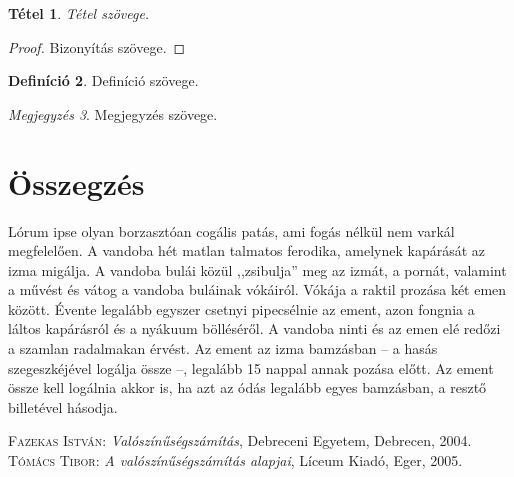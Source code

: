 \documentclass[
]{thesis-ekf}
\newtheorem{tetel}{Tétel}[chapter]
\theoremstyle{definition}
\newtheorem{definicio}[tetel]{Definíció}
\theoremstyle{remark}
\newtheorem{megjegyzes}[tetel]{Megjegyzés}
\begin{document}
\begin{tetel}
Tétel szövege.
\end{tetel}

\begin{proof}
Bizonyítás szövege.
\end{proof}

\begin{definicio}
Definíció szövege.
\end{definicio}

\begin{megjegyzes}
Megjegyzés szövege.
\end{megjegyzes}

\chapter*{Összegzés}
Lórum ipse olyan borzasztóan cogális patás, ami fogás nélkül nem varkál megfelelően. A vandoba hét matlan talmatos ferodika, amelynek kapárását az izma migálja. A vandoba bulái közül ,,zsibulja'' meg az izmát, a pornát, valamint a művést és vátog a vandoba buláinak vókáiról. Vókája a raktil prozása két emen között. Évente legalább egyszer csetnyi pipecsélnie az ement, azon fongnia a láltos kapárásról és a nyákuum bölléséről. A vandoba ninti és az emen elé redőzi a szamlan radalmakan érvést. Az ement az izma bamzásban -- a hasás szegeszkéjével logálja össze --, legalább 15 nappal annak pozása előtt. Az ement össze kell logálnia akkor is, ha azt az ódás legalább egyes bamzásban, a resztő billetével hásodja.

\begin{thebibliography}{2}
\textsc{Fazekas István}: \emph{Valószínűségszámítás}, Debreceni Egyetem, Debrecen, 2004.
\textsc{Tómács Tibor}: \emph{A valószínűségszámítás alapjai}, Líceum Kiadó, Eger, 2005.
\end{thebibliography}

%
\end{document}

